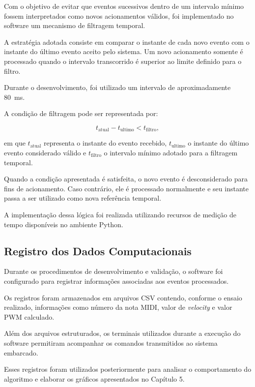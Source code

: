 Com o objetivo de evitar que eventos sucessivos dentro de um intervalo mínimo fossem interpretados como novos acionamentos válidos, foi implementado no software um mecanismo de filtragem temporal.

A estratégia adotada consiste em comparar o instante de cada novo evento com o instante do último evento aceito pelo sistema. Um novo acionamento somente é processado quando o intervalo transcorrido é superior ao limite definido para o filtro.

Durante o desenvolvimento, foi utilizado um intervalo de aproximadamente 80~ms.

A condição de filtragem pode ser representada por:

\begin{equation}
t_{\mathrm{atual}} - t_{\mathrm{ultimo}} < t_{\mathrm{filtro}},
\label{eq:filtro_temporal_midi}
\end{equation}

em que $t_{\mathrm{atual}}$ representa o instante do evento recebido, $t_{\mathrm{ultimo}}$ o instante do último evento considerado válido e $t_{\mathrm{filtro}}$ o intervalo mínimo adotado para a filtragem temporal.

Quando a condição apresentada é satisfeita, o novo evento é desconsiderado para fins de acionamento. Caso contrário, ele é processado normalmente e seu instante passa a ser utilizado como nova referência temporal.

A implementação dessa lógica foi realizada utilizando recursos de medição de tempo disponíveis no ambiente Python.

\subsection{Registro dos Dados Computacionais}
\label{sec:registro_dados_computacionais}

Durante os procedimentos de desenvolvimento e validação, o software foi configurado para registrar informações associadas aos eventos processados.

Os registros foram armazenados em arquivos CSV contendo, conforme o ensaio realizado, informações como número da nota MIDI, valor de \textit{velocity} e valor PWM calculado.

Além dos arquivos estruturados, os terminais utilizados durante a execução do software permitiram acompanhar os comandos transmitidos ao sistema embarcado.

Esses registros foram utilizados posteriormente para analisar o comportamento do algoritmo e elaborar os gráficos apresentados no Capítulo 5.


